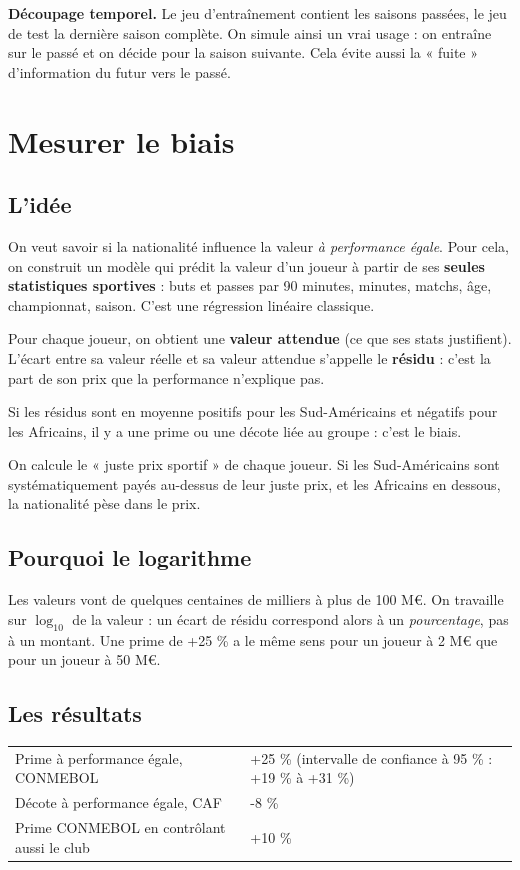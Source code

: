\documentclass[11pt,a4paper]{article}
\begin{document}
\textbf{Découpage temporel.} Le jeu d'entraînement contient les saisons passées, le jeu de test la dernière saison complète. On simule ainsi un vrai usage : on entraîne sur le passé et on décide pour la saison suivante. Cela évite aussi la « fuite » d'information du futur vers le passé.

\section{Mesurer le biais}
\subsection{L'idée}
On veut savoir si la nationalité influence la valeur \emph{à performance égale}. Pour cela, on construit un modèle qui prédit la valeur d'un joueur à partir de ses \textbf{seules statistiques sportives} : buts et passes par 90 minutes, minutes, matchs, âge, championnat, saison. C'est une régression linéaire classique.

Pour chaque joueur, on obtient une \textbf{valeur attendue} (ce que ses stats justifient). L'écart entre sa valeur réelle et sa valeur attendue s'appelle le \textbf{résidu} : c'est la part de son prix que la performance n'explique pas.

Si les résidus sont en moyenne positifs pour les Sud-Américains et négatifs pour les Africains, il y a une prime ou une décote liée au groupe : c'est le biais.

\begin{simple}
On calcule le « juste prix sportif » de chaque joueur. Si les Sud-Américains sont systématiquement payés au-dessus de leur juste prix, et les Africains en dessous, la nationalité pèse dans le prix.
\end{simple}

\subsection{Pourquoi le logarithme}
Les valeurs vont de quelques centaines de milliers à plus de 100 M€. On travaille sur $\log_{10}$ de la valeur : un écart de résidu correspond alors à un \emph{pourcentage}, pas à un montant. Une prime de +25 \% a le même sens pour un joueur à 2 M€ que pour un joueur à 50 M€.

\subsection{Les résultats}
\begin{tabularx}{\linewidth}{@{}l X@{}}
\toprule
Prime à performance égale, CONMEBOL & +25 \% (intervalle de confiance à 95 \% : +19 \% à +31 \%) \\
Décote à performance égale, CAF & -8 \% \\
Prime CONMEBOL en contrôlant aussi le club & +10 \% \\
\bottomrule
\end{tabularx}
\end{document}
